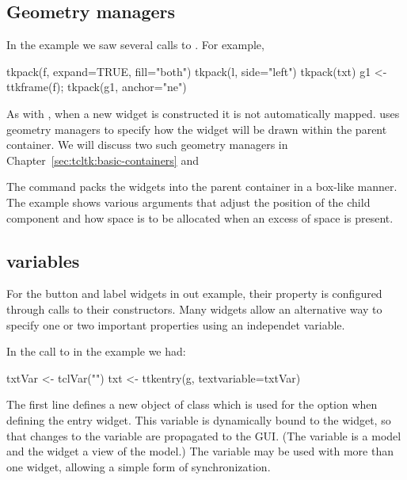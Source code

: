 
\subsection{Geometry managers}
\label{sec:tcltk:overview:geometry-managers}

In the example we saw several calls to . For example,

\begin{Schunk}
\begin{Sinput}
 tkpack(f, expand=TRUE, fill="both")
 tkpack(l, side="left")
 tkpack(txt)
 g1 <- ttkframe(f); tkpack(g1, anchor="ne")
\end{Sinput}
\end{Schunk}


As with \Qt, when a new widget is constructed it is not automatically
mapped. \TK\/ uses geometry managers to specify how the widget will be
drawn within the parent container. We will discuss two such geometry
managers in Chapter~\ref{sec:tcltk:basic-containers}  and 

The  command packs the widgets into the parent container
in a box-like manner. The example shows various arguments that adjust
the position of the child component and how space is to be allocated
when an excess of space is present.



\subsection{\TCL\/ variables}
\label{sec:tcltk:overview:textvariables}


For the button and label widgets in out example, their 
property is configured through calls to their constructors. Many
widgets allow an alternative way to specify one or two important
properties using an independet \Tcl\/ variable.

In the call to  in the example we had:

\begin{Schunk}
\begin{Sinput}
 txtVar <- tclVar("")
 txt <- ttkentry(g, textvariable=txtVar)
\end{Sinput}
\end{Schunk}
%
The first line defines a new object of class  which is
used for the  option when defining the entry
widget. This variable is dynamically bound to the widget, so that
changes to the variable are propagated to the GUI. (The \TCL\/
variable is a model and the widget a view of the model.)  The \Tcl{}
variable may be used with more than one widget, allowing a simple form
of synchronization.

